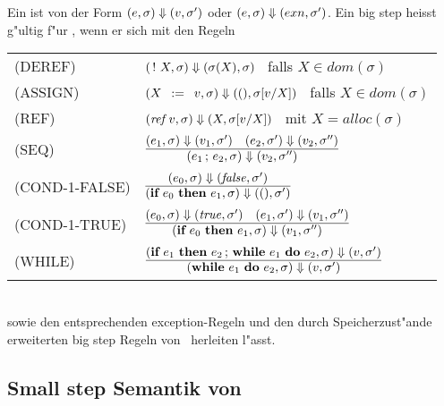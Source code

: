 Ein  ist von der Form $(e,\sigma) \Downarrow (v,\sigma')$ oder $(e,\sigma) \Downarrow (exn,\sigma')$. Ein big step
heisst g"ultig f"ur \LFOUR, wenn er sich mit den Regeln\\[5mm]
  \begin{tabular}{ll}
    \mbox{(DEREF)}        & $(\,!\,\,X, \sigma) \Downarrow (\sigma(X), \sigma)$   \ falls $X \in dom(\sigma)$ \\[3mm]
    \mbox{(ASSIGN)}       & $(X\,\ :=\ \,v, \sigma) \Downarrow ((), \sigma[v/X])$ \ falls $X \in dom(\sigma)$ \\[3mm]
    \mbox{(REF)}          & $({\text{\it ref\/}}\,v, \sigma) \Downarrow (X, \sigma[v/X])$        \ mit $X = alloc(\sigma)$ \\[3mm]
    \mbox{(SEQ)}          & $\regel{(e_1,\sigma) \eval (v_1,\sigma') \quad (e_2,\sigma') \eval (v_2,\sigma'')}
                                   {(e_1\,;\,e_2,\sigma) \eval (v_2,\sigma'')}$ \\[5mm]
    \mbox{(COND-1-FALSE)} & $\regel{(e_0,\sigma) \eval (\false,\sigma')}
                                   {(\bift{e_0}{e_1},\sigma) \eval ((), \sigma')}$ \\[5mm]
    \mbox{(COND-1-TRUE)}  & $\regel{(e_0,\sigma) \eval (\true,\sigma') \quad (e_1,\sigma') \eval (v_1,\sigma'')}
                                   {(\bift{e_0}{e_1},\sigma) \eval (v_1,\sigma'')}$ \\[5mm]
    \mbox{(WHILE)}        & $\regel{(\bift{e_1}{e_2\,;\,\bwd{e_1}{e_2}}, \sigma) \eval (v,\sigma')}
                                   {(\bwd{e_1}{e_2}, \sigma) \eval (v,\sigma')}$
  \end{tabular}\\[7mm]
sowie den entsprechenden exception-Regeln und den durch Speicherzust"ande erweiterten big step Regeln von \LTHREE\ 
herleiten l"asst.


\subsection{Small step Semantik von \LFOUR}

